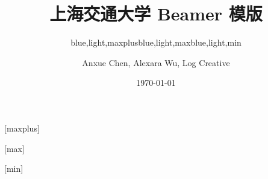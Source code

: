 \documentclass[]{ctexbeamer}
\begin{document}
\title[SJTU Beamer Template] %
{\textbf{上海交通大学 Beamer 模版}} %

\author[Anxue Chen, Alexara Wu, Log Creative]
{Anxue Chen, Alexara Wu, Log Creative}


\date{\today}

\subtitle{blue,light,maxplus}
\logo{\resizebox{!}{0.7cm}{\cnlogo}}
[maxplus]
\maketitle

\subtitle{blue,light,max}
\logo{\resizebox{!}{1cm}{\sjtubadge}}
\titlegraphic{\sjtubg[opacity=0.2]}
[max]
\maketitle

\subtitle{blue,light,min}
\logo{\resizebox{!}{0.7cm}{\enlogo}}
[min]
\maketitle
\end{document}
